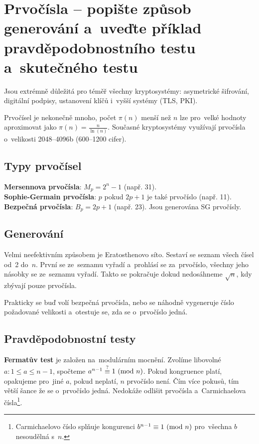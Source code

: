 \section{Prvočísla -- popište způsob generování a~uveďte příklad pravděpodobnostního testu a~skutečného testu}

Jsou extrémně důležitá pro téměř všechny kryptosystémy: asymetrické šifrování, digitální podpisy, ustanovení klíčů i~vyšší systémy (TLS, PKI).

Prvočísel je nekonečně mnoho, počet $\pi(n)$ menší než $n$ lze pro~velké hodnoty aproximovat jako $\pi(n) = \frac{n}{\ln(n)}$. Současné kryptosystémy využívají prvočísla o~velikosti 2048--4096b (600--1200 cifer).

\subsection{Typy prvočísel}

\textbf{Mersennova prvočísla}: $M_p = 2^n - 1$ (např. 31). \\
\textbf{Sophie-Germain prvočísla}: $p$ pokud $2p + 1$ je také prvočíslo (např. 11). \\
\textbf{Bezpečná prvočísla}: $B_p = 2p + 1$ (např. 23). Jsou generována SG prvočísly.

\subsection{Generování}

Velmi neefektivním způsobem je Eratosthenovo síto. Sestaví se seznam všech čísel od~2 do~$n$. První se ze~seznamu vyřadí a~prohlásí se za~prvočíslo, všechny jeho násobky se ze~seznamu vyřadí. Takto se pokračuje dokud nedosáhneme $\sqrt{n}$, kdy zbývají pouze prvočísla.

Prakticky se buď volí bezpečná prvočísla, nebo se náhodně vygeneruje číslo požadované velikosti a~otestuje se, zda se o~prvočíslo jedná.

\subsection{Pravděpodobnostní testy}

\textbf{Fermatův test} je založen na~modulárním mocnění. Zvolíme libovolné $a: 1 \leq a \leq n-1$, spočteme $a^{n-1} \stackrel{?}{\equiv} 1 \ (\mathrm{mod}\ n)$. Pokud kongruence platí, opakujeme pro~jiné $a$, pokud neplatí, $n$ prvočíslo není. Čím více pokusů, tím větší šance že se o~prvočíslo jedná. Nedokáže odlišit prvočísla a~Carmichaelova čísla\footnote{%
Carmichaelovo číslo splňuje kongurenci $b^{n-1} \equiv 1 \ (\mathrm{mod}\ n)$ pro~všechna $b$ nesoudělná s~$n$.
}.

